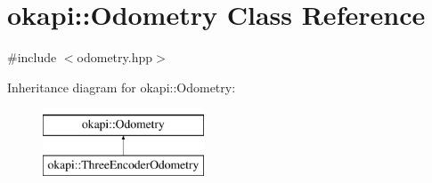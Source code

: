 \hypertarget{classokapi_1_1Odometry}{}\section{okapi\+::Odometry Class Reference}
\label{classokapi_1_1Odometry}


{\ttfamily \#include $<$odometry.\+hpp$>$}

Inheritance diagram for okapi\+::Odometry\+:\begin{figure}[H]
\begin{center}
\leavevmode
\includegraphics[height=2.000000cm]{classokapi_1_1Odometry}
\end{center}
\end{figure}
